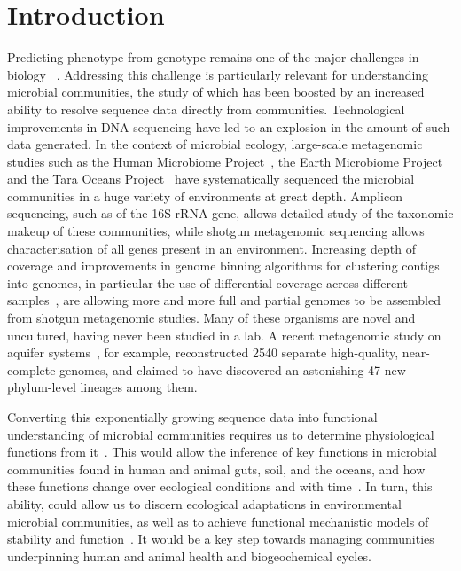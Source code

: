 \documentclass[10pt,letterpaper]{article}
\begin{document}
\section*{Introduction}
Predicting phenotype from genotype remains one of the major challenges in biology ~\cite{Green2008,Martiny2015}. Addressing this challenge is particularly relevant for understanding microbial communities, the study of which has been boosted by an increased ability to resolve sequence data directly from communities. Technological improvements in DNA sequencing have led to an explosion in the amount of such data generated. In the context of microbial ecology, large-scale metagenomic studies such as the Human Microbiome Project~\cite{Huttenhower2012}, the Earth Microbiome Project~\cite{Gilbert2014} and the Tara Oceans Project~\cite{Zhang2015} have systematically sequenced the microbial communities in a huge variety of environments at great depth. Amplicon sequencing, such as of the 16S rRNA gene, allows detailed study of the taxonomic makeup of these communities, while shotgun metagenomic sequencing allows characterisation of all genes present in an environment. Increasing depth of coverage and improvements in genome binning algorithms for clustering contigs into genomes, in particular the use of differential coverage across different samples~\cite{Alneberg2014, Eren2015}, are allowing more and more full and partial genomes to be assembled from shotgun metagenomic studies. Many of these organisms are novel and uncultured, having never been studied in a lab. A recent metagenomic study on aquifer systems~\cite{Anantharaman2016}, for example, reconstructed 2540 separate high-quality, near-complete genomes, and claimed to have discovered an astonishing 47 new phylum-level lineages among them.

Converting this exponentially growing sequence data into functional understanding of microbial communities requires us to determine physiological functions from it~\cite{Widder2016}. This would allow the inference of key functions in microbial
communities found in human and animal guts, soil, and the oceans, and how these functions
change over ecological conditions and with time~\cite{Widder2016}. In
turn, this ability, could allow us to discern ecological adaptations in environmental
microbial communities, as well as to achieve functional mechanistic models of stability and function~\cite{Louca2016c}. It would be a key step towards managing communities underpinning human and animal health and biogeochemical cycles.
\end{document}
